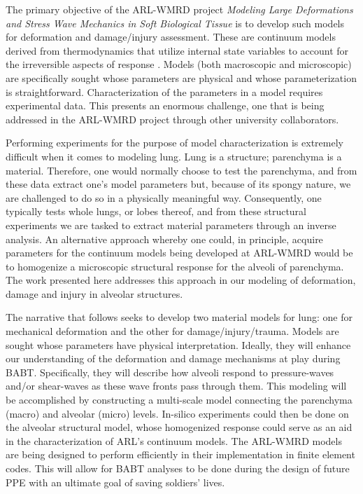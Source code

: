 The primary objective of the ARL-WMRD project \textit{Modeling Large Deformations and Stress Wave Mechanics in Soft Biological Tissue\/} is to develop such models for deformation and damage\slash injury assessment.  These are continuum models derived from thermo\-dynamics that utilize internal state variables to account for the irreversible aspects of response \cite{ClaytonFreed19,ClaytonFreed20}.  Models (both macro\-scopic and micro\-scopic) are specifically sought whose parameters are physical and whose parameterization is straightforward.  Characterization of the parameters in a model requires experimental data.  This presents an enormous challenge, one that is being addressed in the ARL-WMRD project through other university collaborators.  

Performing experiments for the purpose of model characterization is extremely difficult when it comes to modeling lung.  Lung is a structure; parenchyma is a material.  Therefore, one would normally choose to test the parenchyma, and from these data extract one's model parameters but, because of its spongy nature, we are challenged to do so in a physically meaningful way.  Consequently, one typically tests whole lungs, or lobes thereof, and from these structural experiments we are tasked to extract material parameters through an inverse analysis.  An alternative approach whereby one could, in principle, acquire parameters for the continuum models being developed at ARL-WMRD would be to homo\-genize a microscopic structural response for the alveoli of parenchyma.  The work presented here addresses this approach in our modeling of deformation, damage and injury in alveolar structures.

The narrative that follows seeks to develop two material models for lung: one for mechanical deformation and the other for damage\slash injury\slash trauma.  Models are sought whose parameters have physical interpretation.  Ideally, they will enhance our understanding of the deformation and damage mechanisms at play during BABT.  Specifically, they will describe how alveoli respond to pressure-waves and\slash or shear-waves as these wave fronts pass through them.  This modeling will be accomplished by constructing a multi-scale model connecting the parenchyma (macro) and alveolar (micro) levels.  In-silico experiments could then be done on the alveolar structural model, whose homogenized response could serve as an aid in the characterization of ARL's continuum models.  The ARL-WMRD models are being designed to perform efficiently in their implementation in finite element codes.  This will allow for BABT analyses to be done during the design of future PPE with an ultimate goal of saving soldiers' lives.

